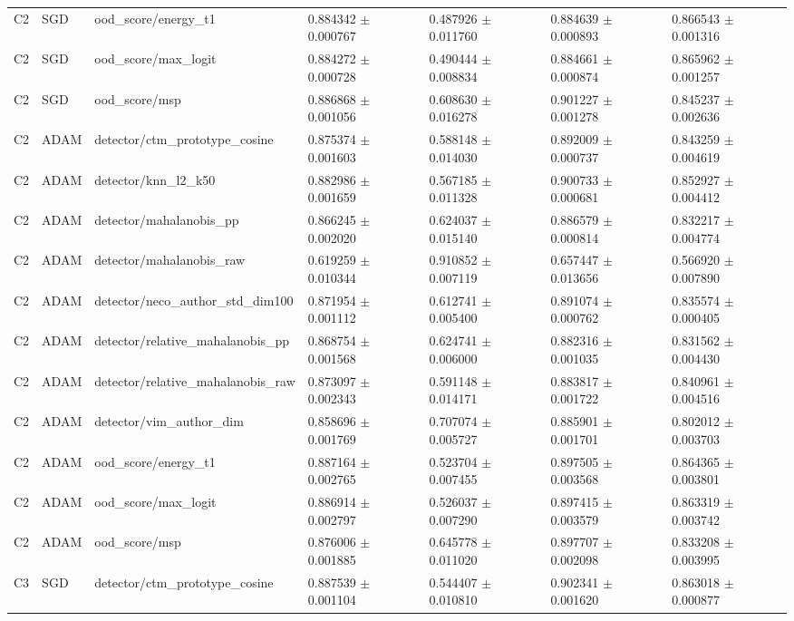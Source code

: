 \begin{longtable}{lllllll}
C2 & SGD & ood\_score/energy\_t1 & 0.884342 $\pm$ 0.000767 & 0.487926 $\pm$ 0.011760 & 0.884639 $\pm$ 0.000893 & 0.866543 $\pm$ 0.001316 \\
C2 & SGD & ood\_score/max\_logit & 0.884272 $\pm$ 0.000728 & 0.490444 $\pm$ 0.008834 & 0.884661 $\pm$ 0.000874 & 0.865962 $\pm$ 0.001257 \\
C2 & SGD & ood\_score/msp & 0.886868 $\pm$ 0.001056 & 0.608630 $\pm$ 0.016278 & 0.901227 $\pm$ 0.001278 & 0.845237 $\pm$ 0.002636 \\
C2 & ADAM & detector/ctm\_prototype\_cosine & 0.875374 $\pm$ 0.001603 & 0.588148 $\pm$ 0.014030 & 0.892009 $\pm$ 0.000737 & 0.843259 $\pm$ 0.004619 \\
C2 & ADAM & detector/knn\_l2\_k50 & 0.882986 $\pm$ 0.001659 & 0.567185 $\pm$ 0.011328 & 0.900733 $\pm$ 0.000681 & 0.852927 $\pm$ 0.004412 \\
C2 & ADAM & detector/mahalanobis\_pp & 0.866245 $\pm$ 0.002020 & 0.624037 $\pm$ 0.015140 & 0.886579 $\pm$ 0.000814 & 0.832217 $\pm$ 0.004774 \\
C2 & ADAM & detector/mahalanobis\_raw & 0.619259 $\pm$ 0.010344 & 0.910852 $\pm$ 0.007119 & 0.657447 $\pm$ 0.013656 & 0.566920 $\pm$ 0.007890 \\
C2 & ADAM & detector/neco\_author\_std\_dim100 & 0.871954 $\pm$ 0.001112 & 0.612741 $\pm$ 0.005400 & 0.891074 $\pm$ 0.000762 & 0.835574 $\pm$ 0.000405 \\
C2 & ADAM & detector/relative\_mahalanobis\_pp & 0.868754 $\pm$ 0.001568 & 0.624741 $\pm$ 0.006000 & 0.882316 $\pm$ 0.001035 & 0.831562 $\pm$ 0.004430 \\
C2 & ADAM & detector/relative\_mahalanobis\_raw & 0.873097 $\pm$ 0.002343 & 0.591148 $\pm$ 0.014171 & 0.883817 $\pm$ 0.001722 & 0.840961 $\pm$ 0.004516 \\
C2 & ADAM & detector/vim\_author\_dim & 0.858696 $\pm$ 0.001769 & 0.707074 $\pm$ 0.005727 & 0.885901 $\pm$ 0.001701 & 0.802012 $\pm$ 0.003703 \\
C2 & ADAM & ood\_score/energy\_t1 & 0.887164 $\pm$ 0.002765 & 0.523704 $\pm$ 0.007455 & 0.897505 $\pm$ 0.003568 & 0.864365 $\pm$ 0.003801 \\
C2 & ADAM & ood\_score/max\_logit & 0.886914 $\pm$ 0.002797 & 0.526037 $\pm$ 0.007290 & 0.897415 $\pm$ 0.003579 & 0.863319 $\pm$ 0.003742 \\
C2 & ADAM & ood\_score/msp & 0.876006 $\pm$ 0.001885 & 0.645778 $\pm$ 0.011020 & 0.897707 $\pm$ 0.002098 & 0.833208 $\pm$ 0.003995 \\
C3 & SGD & detector/ctm\_prototype\_cosine & 0.887539 $\pm$ 0.001104 & 0.544407 $\pm$ 0.010810 & 0.902341 $\pm$ 0.001620 & 0.863018 $\pm$ 0.000877 \\

\end{longtable}
